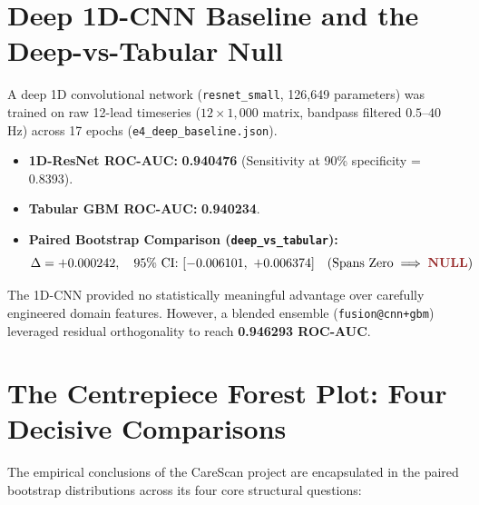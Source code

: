 \documentclass[11pt,a4paper]{report}
\newcommand{\artifact}[1]{\texttt{\footnotesize #1}}
\newcommand{\vnull}{\textcolor{csred}{\textbf{NULL}}}
\begin{document}
\section{Deep 1D-CNN Baseline and the Deep-vs-Tabular Null}
A deep 1D convolutional network (\texttt{resnet\_small}, 126,649 parameters) was trained on raw 12-lead timeseries ($12 \times 1,000$ matrix, bandpass filtered $0.5$--$40$ Hz) across 17 epochs (\artifact{e4\_deep\_baseline.json}).

\begin{itemize}
  \item \textbf{1D-ResNet ROC-AUC:} \textbf{0.940476} (Sensitivity at 90\% specificity = 0.8393).
  \item \textbf{Tabular GBM ROC-AUC:} \textbf{0.940234}.
  \item \textbf{Paired Bootstrap Comparison (\texttt{deep\_vs\_tabular}):}
    \begin{equation}
      \Delta = +0.000242, \quad 95\% \ \text{CI: } [-0.006101, \ +0.006374] \quad (\text{Spans Zero} \implies \vnull)
    \end{equation}
\end{itemize}
The 1D-CNN provided no statistically meaningful advantage over carefully engineered domain features. However, a blended ensemble (\texttt{fusion@cnn+gbm}) leveraged residual orthogonality to reach \textbf{0.946293 ROC-AUC}.

\section{The Centrepiece Forest Plot: Four Decisive Comparisons}
The empirical conclusions of the CareScan project are encapsulated in the paired bootstrap distributions across its four core structural questions:
\end{document}
